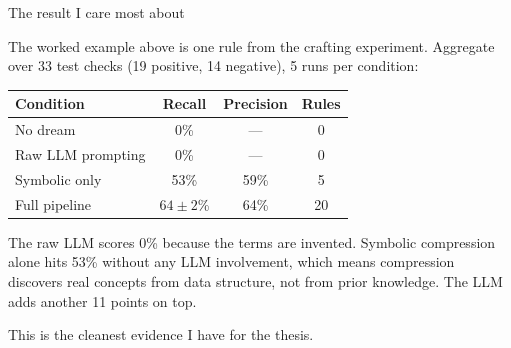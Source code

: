 \documentclass[10pt,aspectratio=169]{beamer}
\begin{document}
\begin{frame}{The result I care most about}

  The worked example above is one rule from the crafting experiment.
  Aggregate over 33 test checks (19 positive, 14 negative), 5 runs per
  condition:

  \begin{center}
  \begin{tabular}{lccc}
    \toprule
    Condition & Recall & Precision & Rules \\
    \midrule
    No dream          & 0\%        & ---  & 0 \\
    Raw LLM prompting & 0\%        & ---  & 0 \\
    Symbolic only     & 53\%       & 59\% & 5 \\
    Full pipeline     & $64 \pm 2$\% & 64\% & 20 \\
    \bottomrule
  \end{tabular}
  \end{center}

  \vspace{0.8em}

  The raw LLM scores 0\% because the terms are invented. Symbolic
  compression alone hits 53\% without any LLM involvement, which means
  compression discovers real concepts from data structure, not from
  prior knowledge. The LLM adds another 11 points on top.

  \vspace{0.4em}

  This is the cleanest evidence I have for the thesis.

\end{frame}
\end{document}
